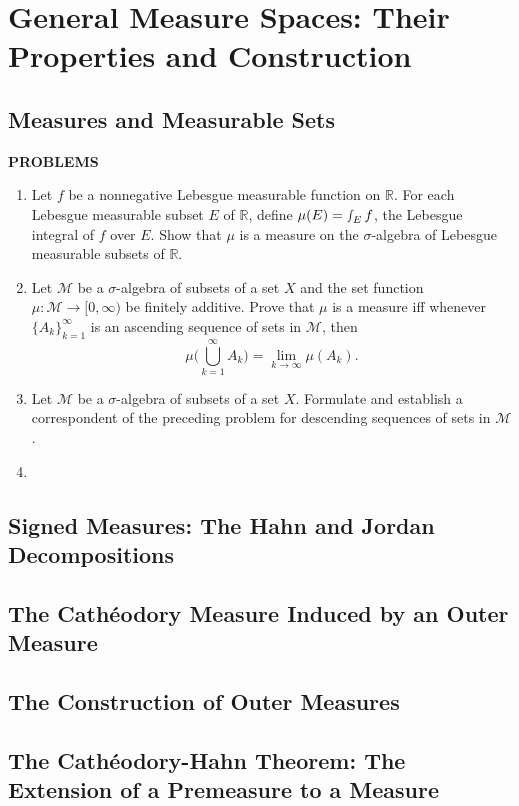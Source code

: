 \chapter{General Measure Spaces: Their Properties and Construction}

\section{Measures and Measurable Sets}

\begin{center}
	\textbf{PROBLEMS}
\end{center}
\begin{enumerate}
	\setcounter{enumi}{0}
	\item Let $f$ be a nonnegative Lebesgue measurable function on $\mathbb{R}$. 
	For each Lebesgue measurable subset $E$ of $\mathbb{R}$, define $\mu(E) = \smallint_E f$, the Lebesgue integral of $f$ over $E$.
	Show that $\mu$ is a measure on the $\sigma$-algebra of Lebesgue measurable subsets of $\mathbb{R}$.
	\item Let $\mathcal{M}$ be a $\sigma$-algebra of subsets of a set $X$ and the set function $\mu : \mathcal{M} \to [0,\infty)$ be finitely additive.
	Prove that $\mu$ is a measure iff whenever $\{A_k\}_{k=1}^\infty$ is an ascending sequence of sets in $\mathcal{M}$, then
	\[
	\mu \biggl ( \bigcup_{k=1}^\infty A_k \biggr ) = \lim_{k \to \infty} \mu(A_k).	
	\]
	\item Let $\mathcal{M}$ be a $\sigma$-algebra of subsets of a set $X$. Formulate and establish a correspondent of the preceding problem for descending sequences of sets in $\mathcal{M}$.
	\item 
\end{enumerate}

\section{Signed Measures: The Hahn and Jordan Decompositions}
\section{The Cath\'eodory Measure Induced by an Outer Measure}
\section{The Construction of Outer Measures}
\section{The Cath\'eodory-Hahn Theorem: The Extension of a Premeasure to a Measure}
